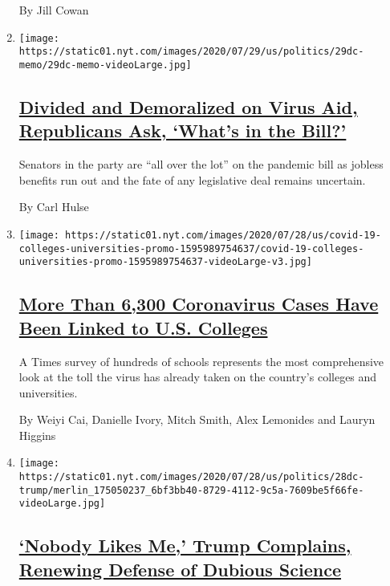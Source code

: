 \begin{enumerate}
  By Jill Cowan
\item
  \texttt{[image: https://static01.nyt.com/images/2020/07/29/us/politics/29dc-memo/29dc-memo-videoLarge.jpg]}

  \hypertarget{divided-and-demoralized-on-virus-aid-republicans-ask-whats-in-the-bill}{%
  \subsection{\texorpdfstring{\href{/2020/07/29/us/politics/republicans-congress-virus-aid.html}{Divided
  and Demoralized on Virus Aid, Republicans Ask, `What's in the
  Bill?'}}{Divided and Demoralized on Virus Aid, Republicans Ask, `What's in the Bill?'}}\label{divided-and-demoralized-on-virus-aid-republicans-ask-whats-in-the-bill}}

  Senators in the party are ``all over the lot'' on the pandemic bill as
  jobless benefits run out and the fate of any legislative deal remains
  uncertain.

  By Carl Hulse
\item
  \texttt{[image: https://static01.nyt.com/images/2020/07/28/us/covid-19-colleges-universities-promo-1595989754637/covid-19-colleges-universities-promo-1595989754637-videoLarge-v3.jpg]}

  \hypertarget{more-than-6300-coronavirus-cases-have-been-linked-to-us-colleges}{%
  \subsection{\texorpdfstring{\href{/interactive/2020/07/28/us/covid-19-colleges-universities.html}{More
  Than 6,300 Coronavirus Cases Have Been Linked to U.S.
  Colleges}}{More Than 6,300 Coronavirus Cases Have Been Linked to U.S. Colleges}}\label{more-than-6300-coronavirus-cases-have-been-linked-to-us-colleges}}

  A Times survey of hundreds of schools represents the most
  comprehensive look at the toll the virus has already taken on the
  country's colleges and universities.

  By Weiyi Cai, Danielle Ivory, Mitch Smith, Alex Lemonides and Lauryn
  Higgins
\item
  \texttt{[image: https://static01.nyt.com/images/2020/07/28/us/politics/28dc-trump/merlin\_175050237\_6bf3bb40-8729-4112-9c5a-7609be5f66fe-videoLarge.jpg]}

  \hypertarget{nobody-likes-me-trump-complains-renewing-defense-of-dubious-science}{%
  \subsection{\texorpdfstring{\href{/2020/07/28/us/politics/trump-nobody-likes-me-walks-out-briefing.html}{`Nobody
  Likes Me,' Trump Complains, Renewing Defense of Dubious
  Science}}{`Nobody Likes Me,' Trump Complains, Renewing Defense of Dubious Science}}\label{nobody-likes-me-trump-complains-renewing-defense-of-dubious-science}}


\end{enumerate}
